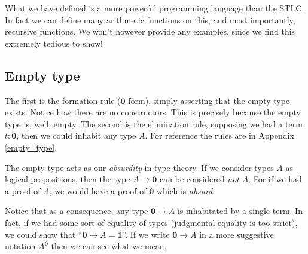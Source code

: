 \begin{remark}
    What we have defined is a more powerful programming language than the STLC. In fact we can define many arithmetic functions on this, and most importantly, recursive functions. We won't however provide any examples, since we find this extremely tedious to show!
\end{remark}

\subsection{Empty type}


    The first is the formation rule ($\mathbf{0}$-form), simply asserting that the empty type exists.
    Notice how there are no constructors. This is precisely because the empty type is, well, empty.
    The second is the elimination rule, supposing we had a term $t : \mathbf{0}$, then we could inhabit any type $A$. For reference the rules are in Appendix \ref{empty_type}.
    

The empty type acts as our \emph{absurdity} in type theory. If we consider types $A$ as logical propositions, then the type $A \to \mathbf{0}$ can be considered \emph{not} $A$. For if we had a proof of $A$, we would have a proof of $\mathbf{0}$ which is \emph{absurd}.

\begin{remark}
    Notice that as a consequence, any type $\mathbf{0} \to A$ is inhabitated by a single term. In fact, if we had some sort of equality of types (judgmental equality is too strict), we could show that ``$\mathbf{0} \to A = \mathbf{1}$''. If we write $\mathbf{0} \to A$ in a more suggestive notation $A^{\mathbf{0}}$ then we can see what we mean.
\end{remark}

